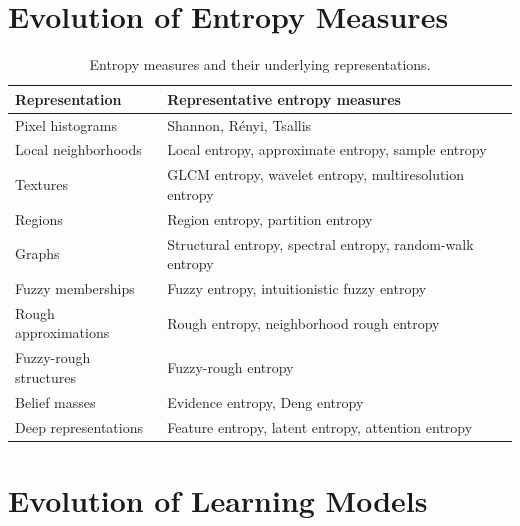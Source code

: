 \documentclass[11pt,oneside]{book}
\theoremstyle{remark}
\begin{document}
	\section{Evolution of Entropy Measures}
	
	\begin{table}[htbp]
		\centering
		\caption{Entropy measures and their underlying representations.}
		\label{tab:entropy-representations}
		
		\begin{tabularx}{\textwidth}{
				>{\raggedright\arraybackslash}p{}
				>{\raggedright\arraybackslash}X
			}
			\toprule
			Representation &
			Representative entropy measures
			\\
			\midrule
			
			Pixel histograms &
			Shannon, Rényi, Tsallis
			\\
			
			Local neighborhoods &
			Local entropy, approximate entropy, sample entropy
			\\
			
			Textures &
			GLCM entropy, wavelet entropy, multiresolution entropy
			\\
			
			Regions &
			Region entropy, partition entropy
			\\
			
			Graphs &
			Structural entropy, spectral entropy, random-walk entropy
			\\
			
			Fuzzy memberships &
			Fuzzy entropy, intuitionistic fuzzy entropy
			\\
			
			Rough approximations &
			Rough entropy, neighborhood rough entropy
			\\
			
			Fuzzy-rough structures &
			Fuzzy-rough entropy
			\\
			
			Belief masses &
			Evidence entropy, Deng entropy
			\\
			
			Deep representations &
			Feature entropy, latent entropy, attention entropy
			\\
			
			\bottomrule
		\end{tabularx}
	\end{table}
	
	\section{Evolution of Learning Models}
	
\end{document}
